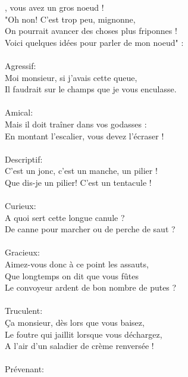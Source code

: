 
, vous avez un gros noeud !
\\"Oh non! C'est trop peu, mignonne,
\\On pourrait avancer des choses plus friponnes !
\\Voici quelques idées pour parler de mon noeud" :
\\\\Agressif:
\\Moi monsieur, si j'avais cette queue,
\\Il faudrait sur le champs que je vous enculasse.
\\\\Amical:
\\Mais il doit traîner dans vos godasses :
\\En montant l'escalier, vous devez l'écraser !
\\\\Descriptif:
\\C'est un jonc, c'est un manche, un pilier !
\\Que dis-je un pilier! C'est un tentacule !
\\\\Curieux:
\\A quoi sert cette longue canule ?
\\De canne pour marcher ou de perche de saut ?
\\\\Gracieux:
\\Aimez-vous donc à ce point les assauts,
\\Que longtemps on dit que vous fûtes
\\Le convoyeur ardent de bon nombre de putes ?
\\\\Truculent:
\\Ça monsieur, dès lors que vous baisez,
\\Le foutre qui jaillit lorsque vous déchargez,
\\A l'air d'un saladier de crème renversée !
\\\\Prévenant:
